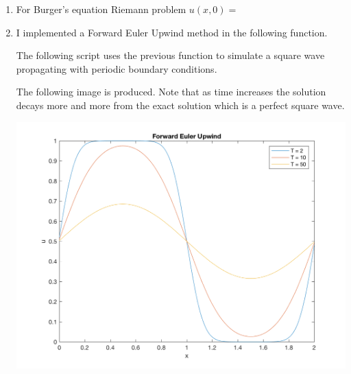 \documentclass[11pt, oneside]{article}
\begin{document}
\begin{enumerate}
  \item %
    For Burger's equation Riemann problem $u(x, 0) = $

  \item %
    I implemented a Forward Euler Upwind method in the following \MATLAB{} function.
    
    The following script uses the previous function to simulate a square wave
    propagating with periodic boundary conditions.
    
    The following image is produced.
    Note that as time increases the solution decays more and more from the exact solution
    which is a perfect square wave.
    \begin{center}
      \includegraphics[scale=.8]{Figures/01_02.png}
    \end{center}


\end{enumerate}
\end{document}
